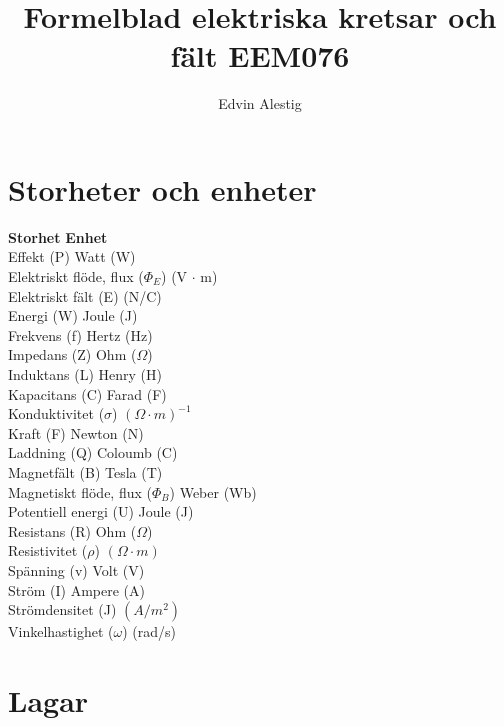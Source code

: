 \documentclass{article}
\title{Formelblad elektriska kretsar och fält EEM076}
\author{Edvin Alestig}
\begin{document}
\maketitle

\section{Storheter och enheter}

\textbf{Storhet} \tab \textbf{Enhet}
\\
Effekt (P) \tab Watt (W)
\\
Elektriskt flöde, flux (\(\Phi_E\)) \tab (V \(\cdot\) m)
\\
Elektriskt fält (E) \tab (N/C)
\\
Energi (W) \tab Joule (J)
\\
Frekvens (f) \tab Hertz (Hz)
\\
Impedans (Z) \tab Ohm ($\Omega$)
\\
Induktans (L) \tab Henry (H)
\\
Kapacitans (C) \tab Farad (F)
\\
Konduktivitet (\(\sigma\)) \tab \( ( \Omega \cdot m )^{-1} \)
\\
Kraft (F) \tab Newton (N)
\\
Laddning (Q)  \tab Coloumb (C)
\\
Magnetfält (B) \tab Tesla (T)
\\
Magnetiskt flöde, flux (\(\Phi_B\)) \tab Weber (Wb)
\\
Potentiell energi (U) \tab Joule (J)
\\
Resistans (R) \tab Ohm ($\Omega$)
\\
Resistivitet (\(\rho\)) \tab \(( \Omega \cdot m )\)
\\
Spänning (v) \tab Volt (V)
\\
Ström (I) \tab Ampere (A)
\\
Strömdensitet (J) \tab \((A/m^2)\)
\\
Vinkelhastighet (\(\omega\)) \tab (rad/s)



\section{Lagar}
\end{document}
